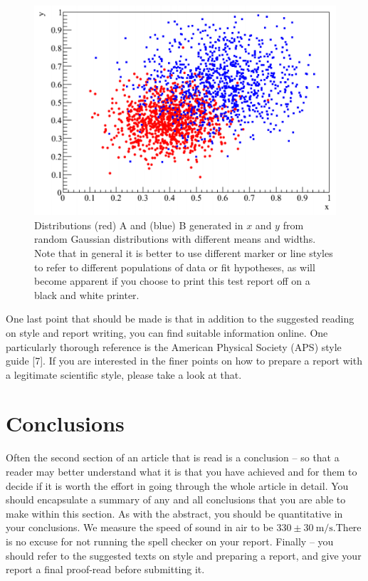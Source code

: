 \documentclass{labreport}
\begin{document}
\begin{figure}
    \includegraphics{diagrams/distribution.PNG}
    \caption{Distributions (red) A and (blue) B generated in $x$ and $y$ from random 
Gaussian distributions with different means and widths.  Note that in general it is 
better to use different marker or line styles to refer to different populations of 
data or fit hypotheses, as will become apparent if you choose to print this test 
report off on a black and white printer.}
    \label{fig:distribution}
\end{figure}

One last point that should be made is that in addition to the suggested reading on 
style and report writing, you can find suitable information online.  One 
particularly thorough reference is the American Physical Society (APS) style 
guide [7].  If you are interested in the finer points on how to prepare a report 
with a legitimate scientific style, please take a look at that.

\section*{Conclusions}
Often the second section of an article that is read is a conclusion – so that a 
reader may better understand what it is that you have achieved and for them to 
decide if it is worth the effort in going through the whole article in detail.  You 
should encapsulate a summary of any and all conclusions that you are able to 
make within this section.  As with the abstract, you should be quantitative in 
your conclusions.  We measure the speed of sound in air to be 
$330 \pm 30 \SI{}{\meter\per\second}.$There is no excuse for not running the spell checker on your report. Finally – you 
should refer to the suggested texts on style and preparing a report, and give your 
report a final proof-read before submitting it. 

\printbibliography
\end{document}
